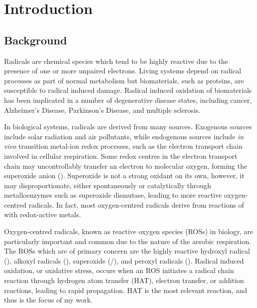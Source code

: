 
\chapter{Introduction}

\section{Background}

Radicals are chemical species which tend to be highly reactive due to the presence of one or more unpaired electrons. Living systems depend on radical processes as part of normal metabolism\cite{Halliwell2015} but biomaterials, such as proteins, are susceptible to radical induced damage. Radical induced oxidation of biomaterials has been implicated in a number of degenerative disease states, including cancer, Alzheimer's Disease, Parkinson's Disease, and multiple sclerosis.\cite{Barnham2004, Valko2007, Hwang2013, Halliwell2007}

In biological systems, radicals are derived from many sources. Exogenous sources include solar radiation and air pollutants, while endogenous sources include \emph{in vivo} transition metal-ion redox processes, such as the electron transport chain involved in cellular respiration.\cite{Turrens2003} Some redox centres in the electron transport chain may uncontrollably transfer an electron to molecular oxygen, forming the superoxide anion (). Superoxide is not a strong oxidant on its own, however, it may disproportionate, either spontaneously or catalytically through metalloenzymes such as superoxide dismutase, leading to more reactive oxygen-centred radicals. In fact, most oxygen-centred radicals derive from reactions of  with redox-active metals.\cite{Halliwell2015}

Oxygen-centred radicals, known as reactive oxygen species (ROSs) in biology, are particularly important and common due to the nature of the aerobic respiration. The ROSs which are of primary concern are the highly reactive hydroxyl radical (), alkoxyl radicals (), superoxide (/), and peroxyl radicals ().\cite{Halliwell2015} Radical induced oxidation, or oxidative stress, occurs when an ROS initiates a radical chain reaction through hydrogen atom transfer (HAT), electron transfer, or addition reactions, leading to rapid propagation. HAT is the most relevant reaction, and thus is the focus of my work.

